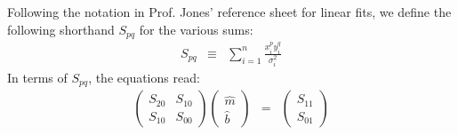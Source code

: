 \documentclass{article}
\begin{document}
Following the notation in Prof. Jones' reference sheet for linear fits, we define the following shorthand $S_{pq}$ for the various sums:
\begin{eqnarray}
  S_{pq} &\equiv& \sum_{i=1}^{n} \frac{x_i^p y_i^q}{\sigma_i^2} \label{shorthand}
\end{eqnarray}
In terms of $S_{pq}$, the equations read:
\begin{eqnarray}
  \left(\begin{array}{cc} S_{20} & S_{10} \\ S_{10} & S_{00} \end{array}\right) \left(\begin{array}{c} \hat{m} \\ \hat{b} \end{array} \right) &=& \left(\begin{array}{c} S_{11} \\ S_{01} \end{array} \right) \label{matrixeqns2}
\end{eqnarray}
\end{document}
